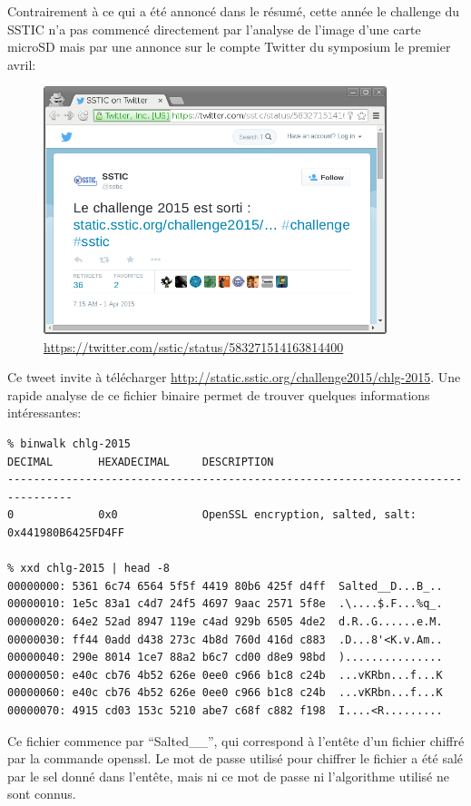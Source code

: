 \documentclass[a4paper,10pt]{article}
\begin{document}
Contrairement à ce qui a été annoncé dans le résumé, cette année le challenge du SSTIC n'a pas commencé directement par l'analyse de l'image d'une carte microSD mais par une annonce sur le compte Twitter du symposium le premier avril:

\begin{figure}[h!]
  \centering
  \includegraphics[width=10cm]{stage0/twitter-screenshot.png}
  \caption{\url{https://twitter.com/sstic/status/583271514163814400}}
\end{figure}

Ce tweet invite à télécharger \url{http://static.sstic.org/challenge2015/chlg-2015}.
Une rapide analyse de ce fichier binaire permet de trouver quelques informations intéressantes:

\begin{verbatim}
% binwalk chlg-2015
DECIMAL       HEXADECIMAL     DESCRIPTION
--------------------------------------------------------------------------------
0             0x0             OpenSSL encryption, salted, salt: 0x441980B6425FD4FF

% xxd chlg-2015 | head -8
00000000: 5361 6c74 6564 5f5f 4419 80b6 425f d4ff  Salted__D...B_..
00000010: 1e5c 83a1 c4d7 24f5 4697 9aac 2571 5f8e  .\....$.F...%q_.
00000020: 64e2 52ad 8947 119e c4ad 929b 6505 4de2  d.R..G......e.M.
00000030: ff44 0add d438 273c 4b8d 760d 416d c883  .D...8'<K.v.Am..
00000040: 290e 8014 1ce7 88a2 b6c7 cd00 d8e9 98bd  )...............
00000050: e40c cb76 4b52 626e 0ee0 c966 b1c8 c24b  ...vKRbn...f...K
00000060: e40c cb76 4b52 626e 0ee0 c966 b1c8 c24b  ...vKRbn...f...K
00000070: 4915 cd03 153c 5210 abe7 c68f c882 f198  I....<R.........
\end{verbatim}

Ce fichier commence par ``Salted\_\_'', qui correspond à l'entête d'un fichier chiffré par la commande openssl.
Le mot de passe utilisé pour chiffrer le fichier a été salé par le sel donné dans l'entête, mais ni ce mot de passe ni l'algorithme utilisé ne sont connus.
\end{document}
